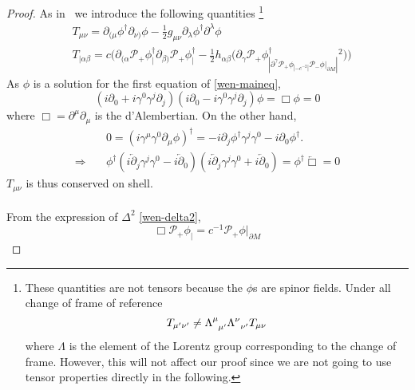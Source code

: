 \begin{proof}
As in~\cite{Zahn2016} we introduce the following quantities
\footnote{
These quantities are not tensors because the $\phi$s are spinor fields. 
Under all change of frame of reference
\begin{equation*}
T_{\mu'\nu'} \neq \Lambda^\mu_{\enskip \mu'}\Lambda^\nu_{\enskip \nu'}T_{\mu \nu} 
\end{equation*}
where $\Lambda$ is the element of the Lorentz group corresponding to the change of frame.
However, 
this will not affect our proof since we are not going to use tensor properties directly in the following.
}
\begin{equation*}
\begin{split}
& T_{\mu\nu} = \partial_{(\mu} \phi^\dagger \partial_{\nu)} \phi - \frac{1}{2}g_{\mu\nu} \partial_\lambda\phi^\dagger\partial^\lambda\phi  \\
& T_{|\alpha\beta} = c\Big( \partial_{(\alpha}\mathcal{P}_+\phi^\dagger_| \partial_{\beta)}\mathcal{P}_+\phi^\dagger_| - 
\frac{1}{2}h_{\alpha\beta}\big( \partial_\gamma\mathcal{P}_+\phi^\dagger_| \partial^\gamma\mathcal{P}_+\phi_|
 - c^{-2}|\mathcal{P}_- \phi\vert_{\partial M}|^2 \big)\Big) 
\end{split}
\end{equation*}
As $\phi$ is a solution for the first equation of \cref{wen-maineq},
\begin{equation*}
(i\partial_0 + i\gamma^0\gamma^j\partial_j)( i\partial_0 -i\gamma^0\gamma^j\partial_j)\phi  = 
\Box \phi= 0
\end{equation*}
where $\Box = \partial^\mu\partial_\mu$ is the d'Alembertian.
On the other hand, 
\begin{equation*}
\begin{split}
&0 = (i\gamma^\mu\gamma^0\partial_\mu\phi)^\dagger
= - i\partial_j\phi^\dagger\gamma^j\gamma^0 - i\partial_0\phi^\dagger. \\
\Rightarrow \quad &
\phi^\dagger(i\overleftarrow{\partial}_j\gamma^j\gamma^0 - i\overleftarrow{\partial}_0)
(i\overleftarrow{\partial}_j\gamma^j\gamma^0 + i\overleftarrow{\partial}_0)
= \phi^\dagger \overleftarrow{\Box} = 0
\end{split}
\end{equation*}
$T_{\mu\nu}$ is thus conserved on shell. \\\\
From the expression of $\Delta^2$ \cref{wen-delta2}, 
\begin{equation*}
\Box\mathcal{P}_+ \phi_| = c^{-1}\mathcal{P}_+\phi\vert_{\partial M}

\end{equation*}
\end{proof}
